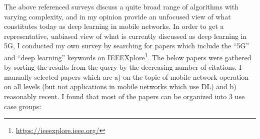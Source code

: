 			
			The above referenced surveys discuss a quite broad range of algorithms with varying complexity, and in my opinion provide an unfocused view of what constitutes today as deep learning in mobile networks.
			In order to get a representative, unbiased view of what is currently discussed as deep learning in \ac{5G}, I conducted my own survey by searching for papers which include the ``\ac{5G}'' and ``deep learning'' keywords on IEEEXplore\footnote{\url{https://ieeexplore.ieee.org/}}.
			The below papers were gathered by sorting the results from the query by the decreasing number of citations.
			I manually selected papers which are a) on the topic of mobile network operation on all levels (but not applications in mobile networks which use \ac{DL}) and b) reasonably recent.
			I found that most of the papers can be organized into $3$ use case groups:
